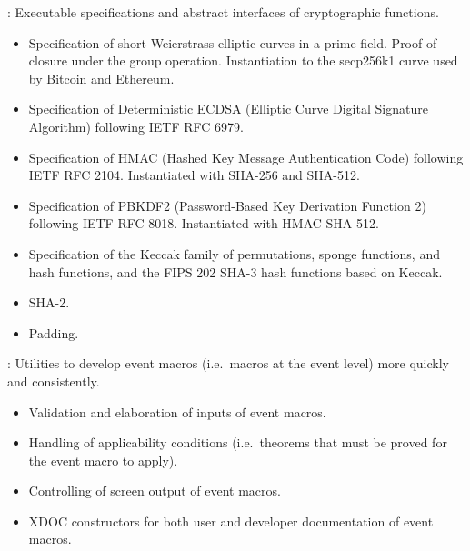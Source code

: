 
\begin{frame}

\newlibtitle

:
Executable specifications and abstract interfaces of cryptographic functions.
\begin{itemize}
\item
Specification of short Weierstrass elliptic curves in a prime field.
Proof of closure under the group operation.
Instantiation to the secp256k1 curve used by Bitcoin and Ethereum.
\item
Specification of Deterministic ECDSA
(Elliptic Curve Digital Signature Algorithm)
following IETF RFC 6979.
\item
Specification of HMAC (Hashed Key Message Authentication Code)
following IETF RFC 2104.
Instantiated with SHA-256 and SHA-512.
\item
Specification of PBKDF2 (Password-Based Key Derivation Function 2)
following IETF RFC 8018.
Instantiated with HMAC-SHA-512.
\item
Specification of the Keccak family of permutations, sponge functions,
and hash functions, and the FIPS 202 SHA-3 hash functions based on Keccak.
\item
SHA-2.
\item
Padding.
\end{itemize}

\end{frame}


\begin{frame}

\newlibtitle

:
Utilities to develop event macros (i.e.\ macros at the event level)
more quickly and consistently.
\begin{itemize}
\item
Validation and elaboration of inputs of event macros.
\item
Handling of applicability conditions
(i.e.\ theorems that must be proved for the event macro to apply).
\item
Controlling of screen output of event macros.
\item
XDOC constructors for both user and developer documentation of event macros.
\end{itemize}

\end{frame}

